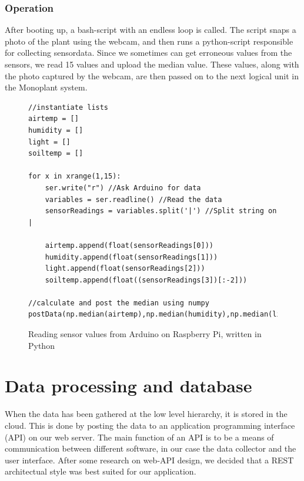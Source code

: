 \subsubsection{Operation}
After booting up, a bash-script with an endless loop is called. The script snaps a photo of the plant using the webcam, and then runs a python-script responsible for collecting sensordata. Since we sometimes can get erroneous values from the sensors, we read 15 values and upload the median value. These values, along with the photo captured by the webcam, are then passed on to the next logical unit in the Monoplant system. 

\lstset{language=Python} 
\begin{figure}
\begin{lstlisting}
//instantiate lists
airtemp = []
humidity = []
light = []
soiltemp = [] 

for x in xrange(1,15): 
	ser.write("r") //Ask Arduino for data
	variables = ser.readline() //Read the data
	sensorReadings = variables.split('|') //Split string on |

	airtemp.append(float(sensorReadings[0]))
	humidity.append(float(sensorReadings[1]))
	light.append(float(sensorReadings[2]))
	soiltemp.append(float((sensorReadings[3])[:-2])) 

//calculate and post the median using numpy
postData(np.median(airtemp),np.median(humidity),np.median(light),np.median(soiltemp)) 
\end{lstlisting}
\caption{Reading sensor values from Arduino on Raspberry Pi, written in Python}
\label{fig:Raspberrycode}
\end{figure}

\section{Data processing and database}
When the data has been gathered at the low level hierarchy, it is stored in the cloud. This is done by posting the data to an application programming interface (API) on our web server. The main function of an API is to be a means of communication between different software, in our case the data collector and the user interface. After some research on web-API design, we decided that a REST architectual style was best suited for our application. 

